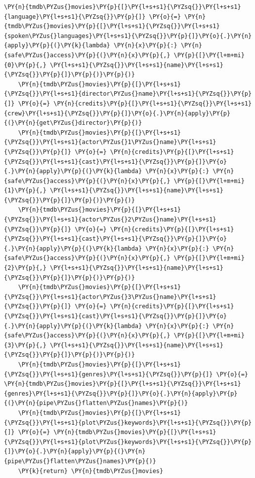 \begin{tcolorbox}[breakable, size=fbox, boxrule=1pt, pad at break*=1mm,colback=cellbackground, colframe=cellborder]
\begin{Verbatim}[commandchars=\\\{\}]
    \PY{n}{tmdb\PYZus{}movies}\PY{p}{[}\PY{l+s+s1}{\PYZsq{}}\PY{l+s+s1}{language}\PY{l+s+s1}{\PYZsq{}}\PY{p}{]} \PY{o}{=} \PY{n}{tmdb\PYZus{}movies}\PY{p}{[}\PY{l+s+s1}{\PYZsq{}}\PY{l+s+s1}{spoken\PYZus{}languages}\PY{l+s+s1}{\PYZsq{}}\PY{p}{]}\PY{o}{.}\PY{n}{apply}\PY{p}{(}\PY{k}{lambda} \PY{n}{x}\PY{p}{:} \PY{n}{safe\PYZus{}access}\PY{p}{(}\PY{n}{x}\PY{p}{,} \PY{p}{[}\PY{l+m+mi}{0}\PY{p}{,} \PY{l+s+s1}{\PYZsq{}}\PY{l+s+s1}{name}\PY{l+s+s1}{\PYZsq{}}\PY{p}{]}\PY{p}{)}\PY{p}{)}
    \PY{n}{tmdb\PYZus{}movies}\PY{p}{[}\PY{l+s+s1}{\PYZsq{}}\PY{l+s+s1}{director\PYZus{}name}\PY{l+s+s1}{\PYZsq{}}\PY{p}{]} \PY{o}{=} \PY{n}{credits}\PY{p}{[}\PY{l+s+s1}{\PYZsq{}}\PY{l+s+s1}{crew}\PY{l+s+s1}{\PYZsq{}}\PY{p}{]}\PY{o}{.}\PY{n}{apply}\PY{p}{(}\PY{n}{get\PYZus{}director}\PY{p}{)}
    \PY{n}{tmdb\PYZus{}movies}\PY{p}{[}\PY{l+s+s1}{\PYZsq{}}\PY{l+s+s1}{actor\PYZus{}1\PYZus{}name}\PY{l+s+s1}{\PYZsq{}}\PY{p}{]} \PY{o}{=} \PY{n}{credits}\PY{p}{[}\PY{l+s+s1}{\PYZsq{}}\PY{l+s+s1}{cast}\PY{l+s+s1}{\PYZsq{}}\PY{p}{]}\PY{o}{.}\PY{n}{apply}\PY{p}{(}\PY{k}{lambda} \PY{n}{x}\PY{p}{:} \PY{n}{safe\PYZus{}access}\PY{p}{(}\PY{n}{x}\PY{p}{,} \PY{p}{[}\PY{l+m+mi}{1}\PY{p}{,} \PY{l+s+s1}{\PYZsq{}}\PY{l+s+s1}{name}\PY{l+s+s1}{\PYZsq{}}\PY{p}{]}\PY{p}{)}\PY{p}{)}
    \PY{n}{tmdb\PYZus{}movies}\PY{p}{[}\PY{l+s+s1}{\PYZsq{}}\PY{l+s+s1}{actor\PYZus{}2\PYZus{}name}\PY{l+s+s1}{\PYZsq{}}\PY{p}{]} \PY{o}{=} \PY{n}{credits}\PY{p}{[}\PY{l+s+s1}{\PYZsq{}}\PY{l+s+s1}{cast}\PY{l+s+s1}{\PYZsq{}}\PY{p}{]}\PY{o}{.}\PY{n}{apply}\PY{p}{(}\PY{k}{lambda} \PY{n}{x}\PY{p}{:} \PY{n}{safe\PYZus{}access}\PY{p}{(}\PY{n}{x}\PY{p}{,} \PY{p}{[}\PY{l+m+mi}{2}\PY{p}{,} \PY{l+s+s1}{\PYZsq{}}\PY{l+s+s1}{name}\PY{l+s+s1}{\PYZsq{}}\PY{p}{]}\PY{p}{)}\PY{p}{)}
    \PY{n}{tmdb\PYZus{}movies}\PY{p}{[}\PY{l+s+s1}{\PYZsq{}}\PY{l+s+s1}{actor\PYZus{}3\PYZus{}name}\PY{l+s+s1}{\PYZsq{}}\PY{p}{]} \PY{o}{=} \PY{n}{credits}\PY{p}{[}\PY{l+s+s1}{\PYZsq{}}\PY{l+s+s1}{cast}\PY{l+s+s1}{\PYZsq{}}\PY{p}{]}\PY{o}{.}\PY{n}{apply}\PY{p}{(}\PY{k}{lambda} \PY{n}{x}\PY{p}{:} \PY{n}{safe\PYZus{}access}\PY{p}{(}\PY{n}{x}\PY{p}{,} \PY{p}{[}\PY{l+m+mi}{3}\PY{p}{,} \PY{l+s+s1}{\PYZsq{}}\PY{l+s+s1}{name}\PY{l+s+s1}{\PYZsq{}}\PY{p}{]}\PY{p}{)}\PY{p}{)}
    \PY{n}{tmdb\PYZus{}movies}\PY{p}{[}\PY{l+s+s1}{\PYZsq{}}\PY{l+s+s1}{genres}\PY{l+s+s1}{\PYZsq{}}\PY{p}{]} \PY{o}{=} \PY{n}{tmdb\PYZus{}movies}\PY{p}{[}\PY{l+s+s1}{\PYZsq{}}\PY{l+s+s1}{genres}\PY{l+s+s1}{\PYZsq{}}\PY{p}{]}\PY{o}{.}\PY{n}{apply}\PY{p}{(}\PY{n}{pipe\PYZus{}flatten\PYZus{}names}\PY{p}{)}
    \PY{n}{tmdb\PYZus{}movies}\PY{p}{[}\PY{l+s+s1}{\PYZsq{}}\PY{l+s+s1}{plot\PYZus{}keywords}\PY{l+s+s1}{\PYZsq{}}\PY{p}{]} \PY{o}{=} \PY{n}{tmdb\PYZus{}movies}\PY{p}{[}\PY{l+s+s1}{\PYZsq{}}\PY{l+s+s1}{plot\PYZus{}keywords}\PY{l+s+s1}{\PYZsq{}}\PY{p}{]}\PY{o}{.}\PY{n}{apply}\PY{p}{(}\PY{n}{pipe\PYZus{}flatten\PYZus{}names}\PY{p}{)}
    \PY{k}{return} \PY{n}{tmdb\PYZus{}movies}
\end{Verbatim}
\end{tcolorbox}

